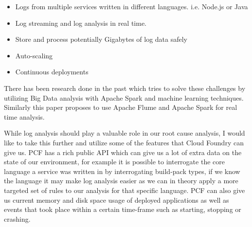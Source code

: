\begin{itemize}
  \item Logs from multiple services written in different languages. i.e. Node.js or Java
  \item Log streaming and log analysis in real time. 
  \item Store and process potentially Gigabytes of log data safely
  \item Auto-scaling
  \item Continuous deployments
\end{itemize}

There has been research done in the past which tries to solve these challenges by utilizing Big Data analysis with Apache Spark and machine learning techniques\cite{8067504}. Similarly this paper\cite{7748933} proposes to use Apache Flume and Apache Spark for real time analysis. 

While log analysis should play a valuable role in our root cause analysis, I would like to take this further and utilize some of the features that Cloud Foundry can give us. PCF has a rich public API which can give us a lot of extra data on the state of our environment, for example it is possible to interrogate the core language a service was written in by interrogating build-pack types, if we know the language it may make log analysis easier as we can in theory apply a more targeted set of rules to our analysis for that specific language. PCF can also give us current memory and disk space usage of deployed applications as well as events that took place within a certain time-frame such as starting, stopping or crashing.